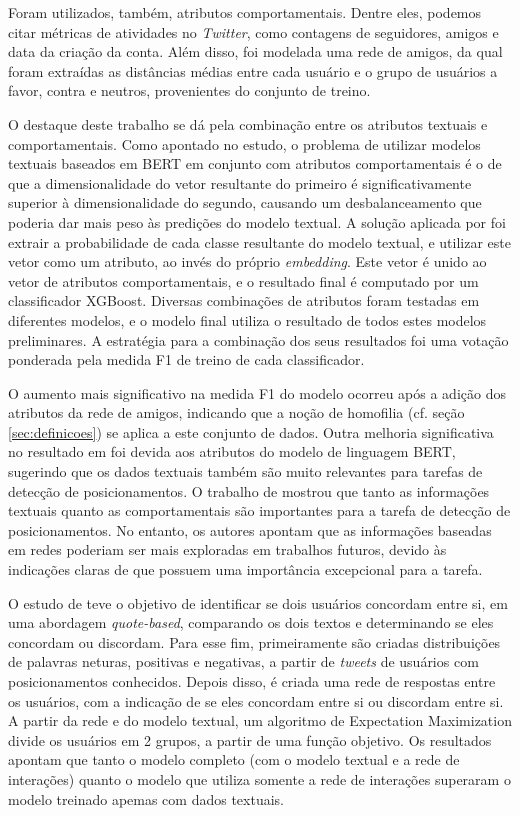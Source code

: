 \documentclass[
	12pt, oneside, a4paper, english, brazil
]{abntex2ppgsi}
\begin{document}
Foram utilizados, também, atributos comportamentais. Dentre eles, podemos citar métricas de atividades no {\em Twitter}, como contagens de seguidores, amigos e data da criação da conta. Além disso, foi modelada uma rede de amigos, da qual foram extraídas as distâncias médias entre cada usuário e o grupo de usuários a favor, contra e neutros, provenientes do conjunto de treino.

O destaque deste trabalho se dá pela combinação entre os atributos textuais e comportamentais. Como apontado no estudo, o problema de utilizar modelos textuais baseados em BERT em conjunto com atributos comportamentais é o de que a dimensionalidade do vetor resultante do primeiro é significativamente superior à dimensionalidade do segundo, causando um desbalanceamento que poderia dar mais peso às predições do modelo textual. A solução aplicada por  foi extrair a probabilidade de cada classe resultante do modelo textual, e utilizar este vetor como um atributo, ao invés do próprio {\em embedding}. Este vetor é unido ao vetor de atributos comportamentais, e o resultado final é computado por um classificador XGBoost. Diversas combinações de atributos foram testadas em diferentes modelos, e o modelo final utiliza o resultado de todos estes modelos preliminares. A estratégia para a combinação dos seus resultados foi uma votação ponderada pela medida F1 de treino de cada classificador.

O aumento mais significativo na medida F1 do modelo ocorreu após a adição dos atributos da rede de amigos, indicando que a noção de homofilia (cf. seção \ref{sec:definicoes}) se aplica a este conjunto de dados. Outra melhoria significativa no resultado em  foi devida aos atributos do modelo de linguagem BERT, sugerindo que os dados textuais também são muito relevantes para tarefas de detecção de posicionamentos. O trabalho de  mostrou que tanto as informações textuais quanto as comportamentais são importantes para a tarefa de detecção de posicionamentos. No entanto, os autores apontam que as informações baseadas em redes poderiam ser mais exploradas em trabalhos futuros, devido às indicações claras de que possuem uma importância excepcional para a tarefa.

O estudo de  teve o objetivo de identificar se dois usuários concordam entre si, em uma abordagem {\em quote-based}, comparando os dois textos e determinando se eles concordam ou discordam. Para esse fim, primeiramente são criadas distribuições de palavras neturas, positivas e negativas, a partir de {\em tweets} de usuários com posicionamentos conhecidos. Depois disso, é criada uma rede de respostas entre os usuários, com a indicação de se eles concordam entre si ou discordam entre si. A partir da rede e do modelo textual, um algoritmo de Expectation Maximization divide os usuários em 2 grupos, a partir de uma função objetivo. Os resultados apontam que tanto o modelo completo (com o modelo textual e a rede de interações) quanto o modelo que utiliza somente a rede de interações superaram o modelo treinado apemas com dados textuais.
\end{document}
